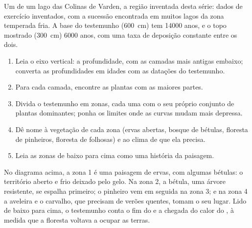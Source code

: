 \begin{omfigure}

{\small Um  de um lago das Colinas de Varden, a região
inventada desta série: dados de exercício inventados, com a sucessão
encontrada em muitos lagos da zona temperada fria. A base do testemunho
(\qty{600}{cm}) tem \num{14000} anos, e o topo mostrado (\qty{300}{cm})
\num{6000} anos, com uma taxa de deposição constante entre os dois.}
\end{omfigure}

\begin{method}
\begin{enumerate}
  \item Leia o eixo vertical: a profundidade, com as camadas mais antigas
        embaixo; converta as profundidades em idades com as datações do
        testemunho.
  \item Para cada camada, encontre as plantas com as maiores partes.
  \item Divida o testemunho em zonas, cada uma com o seu próprio conjunto
        de plantas dominantes; ponha os limites onde as curvas mudam mais
        depressa.
  \item Dê nome à vegetação de cada zona (ervas abertas, bosque de bétulas,
        floresta de pinheiros, floresta de folhosas) e ao clima de que ela
        precisa.
  \item Leia as zonas de baixo para cima como uma história da paisagem.
\end{enumerate}
\end{method}

No diagrama acima, a zona 1 é uma paisagem de ervas, com algumas bétulas: o
território aberto e frio deixado pelo gelo. Na zona 2, a bétula, uma árvore
resistente, se espalha primeiro; o pinheiro vem em seguida na zona 3; e na
zona 4 a aveleira e o carvalho, que precisam de verões quentes, tomam o seu
lugar. Lido de baixo para cima, o testemunho conta o fim do 
e a chegada do calor do , à medida que a floresta voltava a
ocupar as terras.

